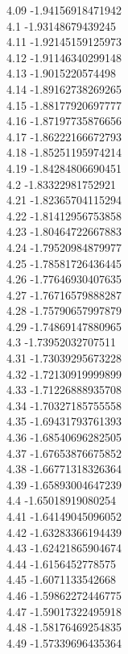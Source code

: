 {4.09	-1.94156918471942\\
4.1	-1.93148679439245\\
4.11	-1.92145159125973\\
4.12	-1.91146340299148\\
4.13	-1.9015220574498\\
4.14	-1.89162738269265\\
4.15	-1.88177920697777\\
4.16	-1.87197735876656\\
4.17	-1.86222166672793\\
4.18	-1.85251195974214\\
4.19	-1.84284806690451\\
4.2	-1.83322981752921\\
4.21	-1.82365704115294\\
4.22	-1.81412956753858\\
4.23	-1.80464722667883\\
4.24	-1.79520984879977\\
4.25	-1.78581726436445\\
4.26	-1.77646930407635\\
4.27	-1.76716579888287\\
4.28	-1.75790657997879\\
4.29	-1.74869147880965\\
4.3	-1.73952032707511\\
4.31	-1.73039295673228\\
4.32	-1.72130919999899\\
4.33	-1.71226888935708\\
4.34	-1.70327185755558\\
4.35	-1.69431793761393\\
4.36	-1.68540696282505\\
4.37	-1.67653876675852\\
4.38	-1.66771318326364\\
4.39	-1.65893004647239\\
4.4	-1.65018919080254\\
4.41	-1.64149045096052\\
4.42	-1.63283366194439\\
4.43	-1.62421865904674\\
4.44	-1.6156452778575\\
4.45	-1.6071133542668\\
4.46	-1.59862272446775\\
4.47	-1.59017322495918\\
4.48	-1.58176469254835\\
4.49	-1.57339696435364\\
}
